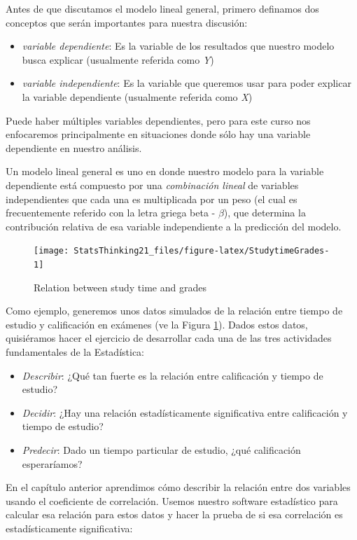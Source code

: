 \documentclass[
  12pt,
]{book}
\providecommand{\tightlist}{%
  \setlength{\itemsep}{0pt}\setlength{\parskip}{0pt}}
\theoremstyle{definition}
\theoremstyle{definition}
\theoremstyle{definition}
\theoremstyle{remark}
\begin{document}
Antes de que discutamos el modelo lineal general, primero definamos dos conceptos que serán importantes para nuestra discusión:

\begin{itemize}
\tightlist
\item
  \emph{variable dependiente}: Es la variable de los resultados que nuestro modelo busca explicar (usualmente referida como \emph{Y})
\item
  \emph{variable independiente}: Es la variable que queremos usar para poder explicar la variable dependiente (usualmente referida como \emph{X})
\end{itemize}

Puede haber múltiples variables dependientes, pero para este curso nos enfocaremos principalmente en situaciones donde sólo hay una variable dependiente en nuestro análisis.

Un modelo lineal general es uno en donde nuestro modelo para la variable dependiente está compuesto por una \emph{combinación lineal} de variables independientes que cada una es multiplicada por un peso (el cual es frecuentemente referido con la letra griega beta - \(\beta\)), que determina la contribución relativa de esa variable independiente a la predicción del modelo.

\begin{figure}
\texttt{[image: StatsThinking21\_files/figure-latex/StudytimeGrades-1]} \caption{Relation between study time and grades}\label{fig:StudytimeGrades}
\end{figure}

Como ejemplo, generemos unos datos simulados de la relación entre tiempo de estudio y calificación en exámenes (ve la Figura \ref{fig:StudytimeGrades}). Dados estos datos, quisiéramos hacer el ejercicio de desarrollar cada una de las tres actividades fundamentales de la Estadística:

\begin{itemize}
\tightlist
\item
  \emph{Describir}: ¿Qué tan fuerte es la relación entre calificación y tiempo de estudio?
\item
  \emph{Decidir}: ¿Hay una relación estadísticamente significativa entre calificación y tiempo de estudio?
\item
  \emph{Predecir}: Dado un tiempo particular de estudio, ¿qué calificación esperaríamos?
\end{itemize}

En el capítulo anterior aprendimos cómo describir la relación entre dos variables usando el coeficiente de correlación. Usemos nuestro software estadístico para calcular esa relación para estos datos y hacer la prueba de si esa correlación es estadísticamente significativa:
\end{document}
